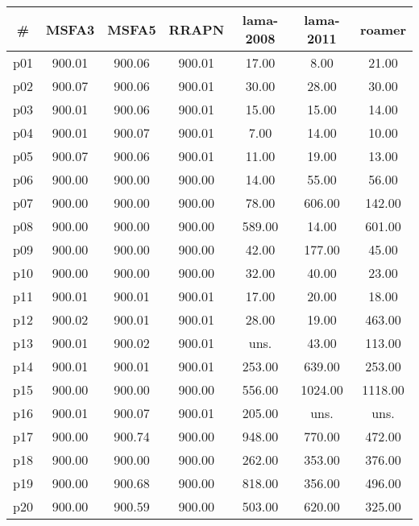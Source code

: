 \begin{tabular}{ccccccc}
\toprule
\textbf{\#} & \textbf{MSFA3} & \textbf{MSFA5} & \textbf{RRAPN} & \textbf{lama-2008} & \textbf{lama-2011} & \textbf{roamer}\\
\midrule
p01 & 900.01 & 900.06 & 900.01 & 17.00 & 8.00 & 21.00\\
p02 & 900.07 & 900.06 & 900.01 & 30.00 & 28.00 & 30.00\\
p03 & 900.01 & 900.06 & 900.01 & 15.00 & 15.00 & 14.00\\
p04 & 900.01 & 900.07 & 900.01 & 7.00 & 14.00 & 10.00\\
p05 & 900.07 & 900.06 & 900.01 & 11.00 & 19.00 & 13.00\\
p06 & 900.00 & 900.00 & 900.00 & 14.00 & 55.00 & 56.00\\
p07 & 900.00 & 900.00 & 900.00 & 78.00 & 606.00 & 142.00\\
p08 & 900.00 & 900.00 & 900.00 & 589.00 & 14.00 & 601.00\\
p09 & 900.00 & 900.00 & 900.00 & 42.00 & 177.00 & 45.00\\
p10 & 900.00 & 900.00 & 900.00 & 32.00 & 40.00 & 23.00\\
p11 & 900.01 & 900.01 & 900.01 & 17.00 & 20.00 & 18.00\\
p12 & 900.02 & 900.01 & 900.01 & 28.00 & 19.00 & 463.00\\
p13 & 900.01 & 900.02 & 900.01 & uns. & 43.00 & 113.00\\
p14 & 900.01 & 900.01 & 900.01 & 253.00 & 639.00 & 253.00\\
p15 & 900.00 & 900.00 & 900.00 & 556.00 & 1024.00 & 1118.00\\
p16 & 900.01 & 900.07 & 900.01 & 205.00 & uns. & uns.\\
p17 & 900.00 & 900.74 & 900.00 & 948.00 & 770.00 & 472.00\\
p18 & 900.00 & 900.00 & 900.00 & 262.00 & 353.00 & 376.00\\
p19 & 900.00 & 900.68 & 900.00 & 818.00 & 356.00 & 496.00\\
p20 & 900.00 & 900.59 & 900.00 & 503.00 & 620.00 & 325.00\\
\bottomrule
\end{tabular}


